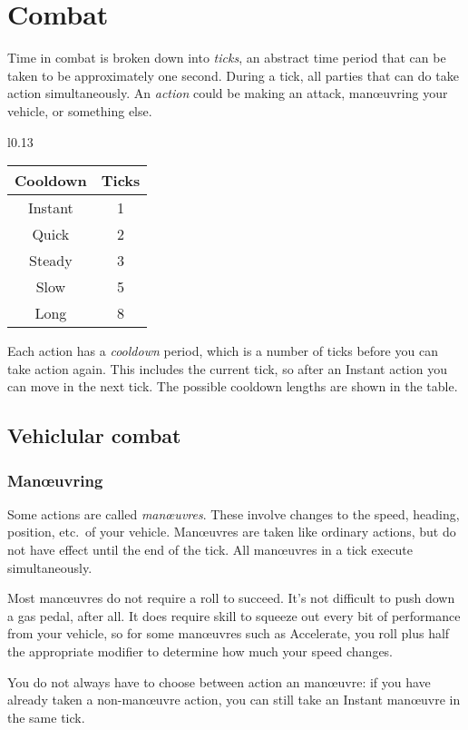 \documentclass[10pt, a4paper, twocolumn]{article}
\begin{document}
\section{Combat}
Time in combat is broken down into \emph{ticks}, an abstract time period that
can be taken to be approximately one second. During a tick, all parties that
can do take action simultaneously. An \emph{action} could be making an attack,
man\oe{}uvring your vehicle, or something else.

\begin{wraptable}[7]{l}{0.13\textwidth}
\vspace*{-3ex}
\begin{tabular}{cc}
  Cooldown & Ticks \\
  \hline 
  Instant  & 1     \\
  Quick    & 2     \\
  Steady   & 3     \\
  Slow     & 5     \\
  Long     & 8
\end{tabular}
\end{wraptable}

Each action has a \emph{cooldown} period, which is a number of ticks before you
can take action again. This includes the current tick, so after an Instant
action you can move in the next tick. The possible cooldown lengths are shown in
the table. 

\subsection{Vehiclular combat}

\subsubsection{Man\oe{}uvring}
Some actions are called \emph{man\oe{}uvres}. These involve changes to the speed,
heading, position, etc.\ of your vehicle. Man\oe{}uvres are taken like ordinary
actions, but do not have effect until the end of the tick. All man\oe{}uvres in a
tick execute simultaneously.

Most man\oe{}uvres do not require a roll to succeed. It's not difficult to push
down a gas pedal, after all. It does require skill to squeeze out every bit of
performance from your vehicle, so for some man\oe{}uvres such as Accelerate, you
roll  plus half the appropriate modifier to determine how much your
speed changes.

You do not always have to choose between action an man\oe{}uvre: if you have
already taken a non-man\oe{}uvre action, you can still take an Instant
man\oe{}uvre in the same tick.
\end{document}
